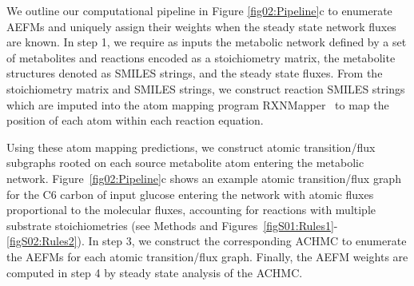 \documentclass[12pt]{article}
\begin{document}
We outline our computational pipeline in Figure \ref{fig02:Pipeline}c to
enumerate AEFMs and uniquely assign their weights when the steady state
network fluxes are known. In step 1, we require as inputs the metabolic
network defined by a set of metabolites and reactions encoded as
a stoichiometry matrix, the metabolite structures denoted as SMILES
strings, and the steady state fluxes. From the stoichiometry matrix and
SMILES strings, we construct reaction SMILES strings which are imputed
into the atom mapping program RXNMapper~\citep{Schwaller2021extraction} to
map the position of each atom within each reaction equation.


Using these atom mapping predictions, we construct atomic transition/flux
subgraphs rooted on each source metabolite atom entering the metabolic
network. Figure~\ref{fig02:Pipeline}c shows an example atomic
transition/flux graph for the C6 carbon of input glucose entering the
network with atomic fluxes proportional to the molecular fluxes,
accounting for reactions with multiple substrate stoichiometries
(see Methods and Figures~{\ref{figS01:Rules1}}-{\ref{figS02:Rules2}}). In
step 3, we construct the corresponding ACHMC to enumerate the AEFMs for
each atomic transition/flux graph. Finally, the AEFM weights are computed
in step 4 by steady state analysis of the ACHMC. 

\end{document}
